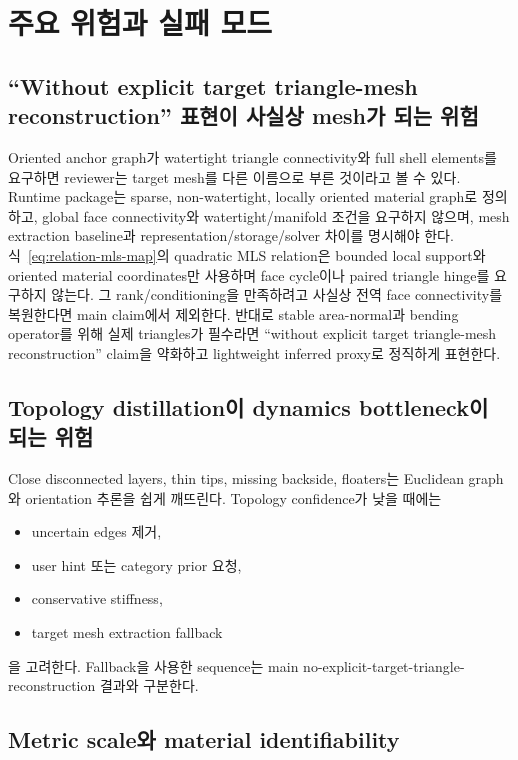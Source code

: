 \documentclass[11pt,a4paper]{article}
\begin{document}
\section{주요 위험과 실패 모드}

\subsection{``Without explicit target triangle-mesh reconstruction'' 표현이 사실상 mesh가 되는 위험}

Oriented anchor graph가 watertight triangle connectivity와 full shell elements를 요구하면
reviewer는 target mesh를 다른 이름으로 부른 것이라고 볼 수 있다.
Runtime package는 sparse, non-watertight, locally oriented material graph로 정의하고,
global face connectivity와 watertight/manifold 조건을 요구하지 않으며,
mesh extraction baseline과 representation/storage/solver 차이를 명시해야 한다.
식~\eqref{eq:relation-mls-map}의 quadratic MLS relation은 bounded local support와
oriented material coordinates만 사용하며 face cycle이나 paired triangle hinge를 요구하지 않는다.
그 rank/conditioning을 만족하려고 사실상 전역 face connectivity를 복원한다면 main claim에서 제외한다.
반대로 stable area-normal과 bending operator를 위해 실제 triangles가 필수라면
``without explicit target triangle-mesh reconstruction'' claim을 약화하고
lightweight inferred proxy로 정직하게 표현한다.

\subsection{Topology distillation이 dynamics bottleneck이 되는 위험}

Close disconnected layers, thin tips, missing backside, floaters는
Euclidean graph와 orientation 추론을 쉽게 깨뜨린다.
Topology confidence가 낮을 때에는

\begin{itemize}[leftmargin=1.5em]
  \item uncertain edges 제거,
  \item user hint 또는 category prior 요청,
  \item conservative stiffness,
  \item target mesh extraction fallback
\end{itemize}

을 고려한다.
Fallback을 사용한 sequence는 main no-explicit-target-triangle-reconstruction 결과와 구분한다.

\subsection{Metric scale와 material identifiability}
\end{document}
